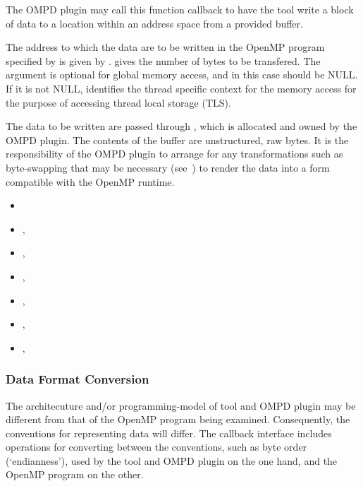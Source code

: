 \descr
The OMPD plugin may call this function callback to have the tool write a block of data
to a location within an address space from a provided buffer.

\argdesc
The address to which the data are to be written in the OpenMP program
specified by  is given by .
 gives the number of bytes to be transfered.
The  argument is optional for global memory access,
and in this case should be NULL.
If it is not NULL,  identifies the thread
specific context for the memory access for the purpose of accessing
thread local storage (TLS).

The data to be written are passed through , which is allocated and
owned by the OMPD plugin.
The contents of the buffer are unstructured, raw bytes.
It is the responsibility of the OMPD plugin to arrange for
any transformations such as byte-swapping that may be necessary
(see~)
to render the data into a form compatible with the OpenMP runtime.

\crossreferences
\begin{itemize}
\item
   
\item
  , 
\item
  , 
\item
  , 
\item
  , 
\item
  , 
\item
  , 
\end{itemize}

\subsubsection{Data Format Conversion}
\label{ompd:data-format-conversion}

The architecuture and/or programming-model of tool and
OMPD plugin may be different from that of the OpenMP program being
examined.
Consequently, the conventions for representing data will differ.
The callback interface includes operations for converting between
the conventions, such as byte order (`endianness'),
used by the tool and OMPD plugin on the
one hand, and the OpenMP program on the other.

